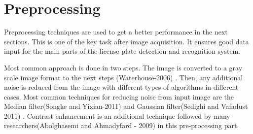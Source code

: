 \documentclass{standalone}
\begin{document}
\section{Preprocessing}
Preprocessing techniques are used to get a better performance in the next sections. This is one of the key task after image acquisition. It ensures good data input for the main parts of the license plate detection and recognition system.

Most common approach is done in two steps. The image is converted to a gray scale image format to the next steps (Waterhouse-2006) \cite{waterhouse-2006}. Then, any additional noise is reduced from the image with different types of algorithms in different cases. Most common techniques for reducing noise from input image are the Median filter(Songke and Yixian-2011) \cite{songke-yixian}
and Gaussian filter(Sedighi and Vafadust 2011) \cite{sedighi-vafadust}. Contrast enhancement is an additional technique followed by many researchers(Abolghasemi and Ahmadyfard - 2009) \cite{Abolghasemi2009} in this pre-processing part.
\end{document}
